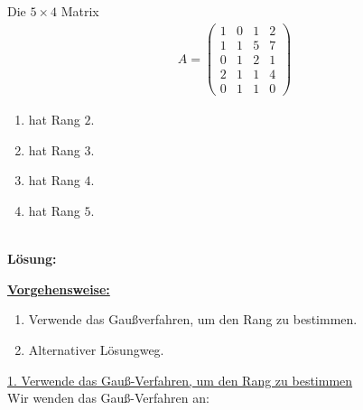 \subsection*{}
Die $5 \times 4$ Matrix
\begin{align*}
A
=
\begin{pmatrix}
1 & 0  & 1 & 2\\
1 & 1 & 5 & 7\\
0 & 1 & 2 & 1 \\
2 & 1 & 1 & 4 \\
0 & 1 & 1 & 0 
\end{pmatrix}
\end{align*}
\renewcommand{\labelenumi}{(\alph{enumi})}
\begin{enumerate}
\item 
hat Rang $2$.
\item
hat Rang $3$.
\item
hat Rang $4$.
\item
hat Rang $5$.
\end{enumerate}
\ \\
\textbf{Lösung:}
\begin{mdframed}
\underline{\textbf{Vorgehensweise:}}
\renewcommand{\labelenumi}{\theenumi.}
\begin{enumerate}
\item Verwende das Gaußverfahren, um den Rang zu bestimmen.
\item 
Alternativer Lösungweg.
\end{enumerate}
\end{mdframed}
\allowdisplaybreaks
\underline{1. Verwende das Gauß-Verfahren, um den Rang zu bestimmen}\\
Wir wenden das Gauß-Verfahren an:
